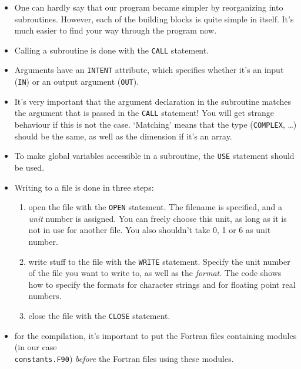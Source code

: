 \documentclass[a4paper]{article}
\begin{document}
\begin{itemize}
	\item One can hardly say that our program became simpler by reorganizing into subroutines. However, each of the building blocks is quite simple in itself. It's much easier to find your way through the program now.
	\item Calling a subroutine is done with the \verb+CALL+ statement. 
	\item Arguments have an \verb+INTENT+ attribute, which specifies whether it's an input (\verb+IN+) or an output argument (\verb+OUT+).
	\item It's very important that the argument declaration in the subroutine matches the argument that is passed in the \verb+CALL+ statement! You will get strange behaviour if this is not the case. `Matching' means that the type (\verb+COMPLEX+, \ldots) should be the same, as well as the dimension if it's an array.
	\item To make global variables accessible in a subroutine, the \verb+USE+ statement should be used.
	\item Writing to a file is done in three steps:
		\begin{enumerate}
			\item open the file with the \verb+OPEN+ statement. The filename is specified, and a \emph{unit} number is assigned. You can freely choose this unit, as long as it is not in use for another file. You also shouldn't take 0, 1 or 6 as unit number.
			\item write stuff to the file with the \verb+WRITE+ statement. Specify the unit number of the file you want to write to, as well as the \emph{format}. The code shows how to specify the formats for character strings and for floating point real numbers.
			\item close the file with the \verb+CLOSE+ statement.
		\end{enumerate}
	\item for the compilation, it's important to put the Fortran files containing modules (in our case\\ \verb+constants.F90+) \emph{before} the Fortran files using these modules.
\end{itemize}
%
\end{document}
